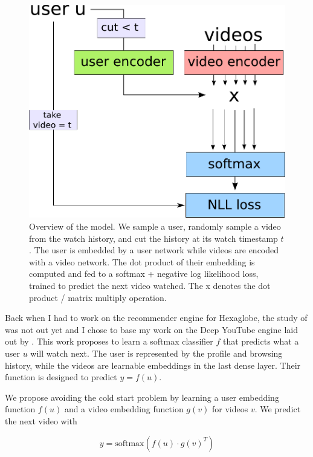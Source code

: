 \begin{figure}
    \centering
    \includegraphics[scale=0.7]{70-files/xvrec-general.pdf}
    \caption{Overview of the model. We sample a user, randomly sample a video from the watch history, and cut the history at its watch timestamp $t$. The user is embedded by a user network while videos are encoded with a video network. The dot product of their embedding is computed and fed to a softmax + negative log likelihood loss, trained to predict the next video watched. The x denotes the dot product / matrix multiply operation.}
    \label{fig:xvrec-model}
\end{figure}

Back when I had to work on the recommender engine for Hexaglobe, the study of \citet{dlinrec} was not out yet and I chose to base my work on the Deep YouTube engine laid out by \citet{youtuberec}. This work proposes to learn a softmax classifier $f$ that predicts what a user $u$ will watch next. The user is represented by the profile and browsing history, while the videos are learnable embeddings in the last dense layer. Their function is designed to predict $y=f(u)$.

We propose avoiding the cold start problem by learning a user embedding function $f(u)$ and a video embedding function $g(v)$ for videos $v$. We predict the next video with 

\begin{equation}
    y=\text{softmax}(f(u) \cdot g(v)^T)
\end{equation}

